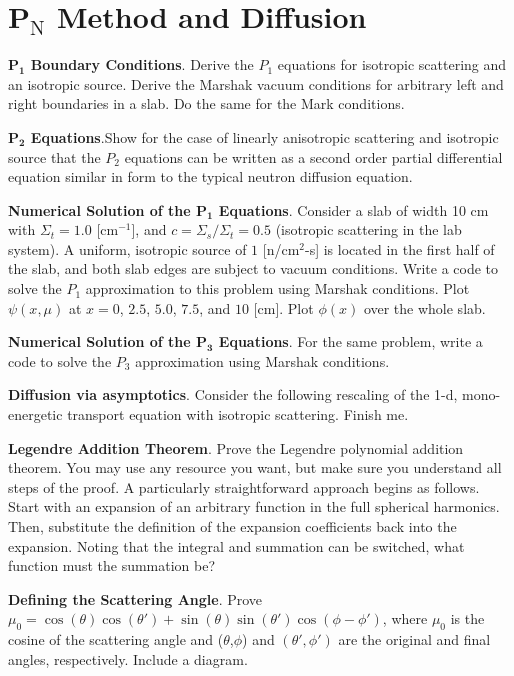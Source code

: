 
\chapter{P$\mathrm{_N}$ Method and Diffusion}

\begin{exercises}

  \item  \textbf{P$_{\mathbf{1}}$ Boundary Conditions}. Derive the $P_1$ equations for isotropic scattering and an isotropic source.  Derive the Marshak vacuum conditions for arbitrary left and right boundaries in a slab.  Do the same for the Mark conditions. 

  \item \textbf{P$_{\mathbf{2}}$ Equations}.Show for the case of linearly anisotropic scattering and isotropic source that the $P_2$ equations can be written as a second order partial differential equation similar in form to the typical neutron diffusion equation.

  \item \textbf{Numerical Solution of the P$_{\mathbf{1}}$ Equations}. Consider a slab of width 10 cm with $\Sigma_t = 1.0$ [cm$^{-1}$], and $c = \Sigma_s / \Sigma_t = 0.5$ (isotropic scattering in the lab system).  A uniform, isotropic source of $1$ [n/cm$^2$-s] is located in the first half of the slab, and both slab edges are subject to vacuum conditions. Write a code to solve the $P_1$ approximation to this problem using Marshak conditions.  Plot $\psi(x,\mu)$ at $x = 0$, $2.5$, $5.0$, $7.5$, and $10$ [cm].  Plot $\phi(x)$ over the whole slab.

  \item \textbf{Numerical Solution of the P$_{\mathbf{3}}$ Equations}. For the same problem, write a code to solve the $P_3$ approximation using Marshak conditions.

  \item \textbf{ Diffusion via asymptotics}.  Consider the following rescaling of the 1-d, mono-energetic transport equation with isotropic scattering. Finish me.

  \item \textbf{Legendre Addition Theorem}. Prove the Legendre polynomial addition theorem.  You may use any resource you want, but make sure you understand all steps of the proof.  A particularly straightforward approach begins as follows.  Start with an expansion of an arbitrary function in the full spherical harmonics.  Then, substitute the definition of the expansion coefficients back into the expansion.  Noting that the integral and summation can be switched, what function must the summation be?  

  \item \textbf{Defining the Scattering Angle}. Prove $\mu_0 = \cos(\theta)\cos(\theta')+\sin(\theta)\sin(\theta')\cos(\phi-\phi')$, where $\mu_0$ is the cosine of the scattering angle and ($\theta$,$\phi$) and $(\theta',\phi')$ are the original and final angles, respectively.  Include a diagram.

\end{exercises}
